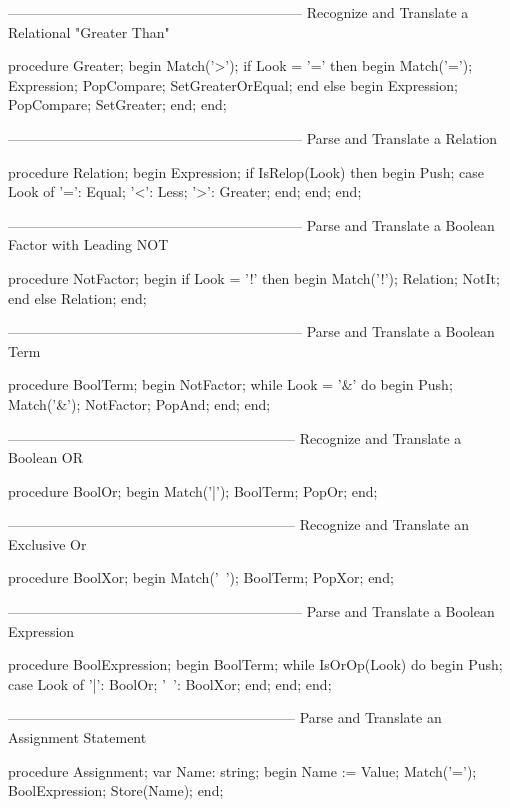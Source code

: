 \documentclass[float=false, crop=false]{standalone}
\begin{document}
\begin{code}
{---------------------------------------------------------------}
{ Recognize and Translate a Relational "Greater Than" }

procedure Greater;
begin
   Match('>');
   if Look = '=' then begin
      Match('=');
      Expression;
      PopCompare;
      SetGreaterOrEqual;
      end
   else begin
      Expression;
      PopCompare;
      SetGreater;
   end;
end;


{---------------------------------------------------------------}
{ Parse and Translate a Relation }


procedure Relation;
begin
   Expression;
   if IsRelop(Look) then begin
      Push;
      case Look of
       '=': Equal;
       '<': Less;
       '>': Greater;
      end;
   end;
end;


{---------------------------------------------------------------}
{ Parse and Translate a Boolean Factor with Leading NOT }

procedure NotFactor;
begin
   if Look = '!' then begin
      Match('!');
      Relation;
      NotIt;
      end
   else
      Relation;
end;


{---------------------------------------------------------------}
{ Parse and Translate a Boolean Term }

procedure BoolTerm;
begin
   NotFactor;
   while Look = '&' do begin
      Push;
      Match('&');
      NotFactor;
      PopAnd;
   end;
end;


{--------------------------------------------------------------}
{ Recognize and Translate a Boolean OR }

procedure BoolOr;
begin
   Match('|');
   BoolTerm;
   PopOr;
end;


{--------------------------------------------------------------}
{ Recognize and Translate an Exclusive Or }

procedure BoolXor;
begin
   Match('~');
   BoolTerm;
   PopXor;
end;


{---------------------------------------------------------------}
{ Parse and Translate a Boolean Expression }

procedure BoolExpression;
begin
   BoolTerm;
   while IsOrOp(Look) do begin
      Push;
      case Look of
       '|': BoolOr;
       '~': BoolXor;
      end;
   end;
end;


{--------------------------------------------------------------}
{ Parse and Translate an Assignment Statement }

procedure Assignment;
var Name: string;
begin
   Name := Value;
   Match('=');
   BoolExpression;
   Store(Name);
end;



\end{code}
\end{document}
